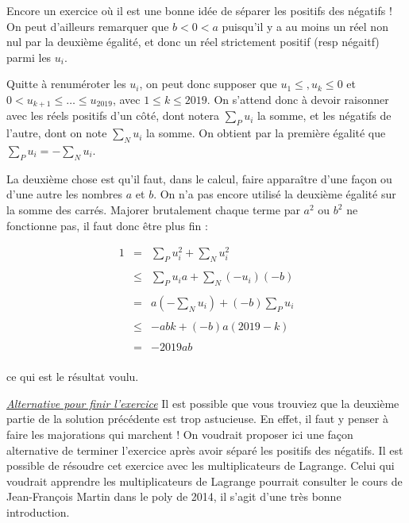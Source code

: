 \begin{sol}
Encore un exercice où il est une bonne idée de séparer les positifs des négatifs ! On peut d'ailleurs remarquer que $b< 0 < a$ puisqu'il y a au moins un réel non nul par la deuxième égalité, et donc un réel strictement positif (resp négaitf) parmi les $u_i$.

Quitte à renuméroter les $u_i$, on peut donc supposer que $u_1 \leqslant , u_k \leqslant 0$ et $0<u_{k+1} \leqslant \ldots \leqslant u_{2019}$, avec $1\leqslant k \leqslant 2019$. On s'attend donc à devoir raisonner avec les réels positifs d'un côté, dont notera $\sum_P u_i$ la somme, et les négatifs de l'autre, dont on note $\sum_N u_i$ la somme. On obtient par la première égalité que $\sum_P u_i = - \sum_N u_i$.

La deuxième chose est qu'il faut, dans le calcul, faire apparaître d'une façon ou d'une autre les nombres $a$ et $b$. On n'a pas encore utilisé la deuxième égalité sur la somme des carrés. Majorer brutalement chaque terme par $a^2$ ou $b^2$ ne fonctionne pas, il faut donc être plus fin :

\[\begin{array}{lll}
1 &=&\displaystyle \sum_P u_i^2 + \sum_N u_i^2 \\
&&\\
&\leqslant & \displaystyle \sum_P u_i a + \sum_N (-u_i) (-b)\\
&&\\
&=&\displaystyle a(-\sum_N u_i) + (-b) \sum_P u_i \\
&&\\
&\leqslant&\displaystyle -abk + (-b) a(2019-k) \\
&&\\
&=& \displaystyle -2019ab\\
\end{array}\]

ce qui est le résultat voulu.

\underline{\textit{Alternative pour finir l'exercice}}
Il est possible que vous trouviez que la deuxième partie de la solution précédente est trop astucieuse. En effet, il faut y penser à faire les majorations qui marchent ! On voudrait proposer ici une façon alternative de terminer l'exercice après avoir séparé les positifs des négatifs. Il est possible de résoudre cet exercice avec les multiplicateurs de Lagrange. Celui qui voudrait apprendre les multiplicateurs de Lagrange pourrait consulter le cours de Jean-François Martin dans le poly de 2014, il s'agit d'une très bonne introduction.


\end{sol}

